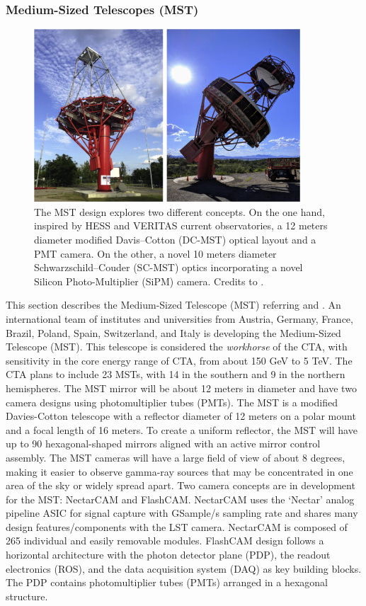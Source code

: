 \subsubsection{Medium-Sized Telescopes (MST)}
\begin{figure}[t]
\centering
\includegraphics[width=0.9\linewidth]{figures/introduction/mst.jpg}
\caption{The MST design explores two different concepts. On the one hand, inspired by HESS and VERITAS current observatories, a 12 meters diameter modified Davis–Cotton (DC-MST) optical layout and a PMT camera. On the other, a novel 10 meters diameter Schwarzschild–Couder (SC-MST) optics incorporating a novel Silicon Photo-Multiplier (SiPM) camera. Credits to \cite{Barrio_2020}.} 
\label{fig:mst}
\end{figure}
This section describes the Medium-Sized Telescope (MST) referring \cite{Barrio_2020} and \cite{ctaobservatorywebsitetechnology}.
An international team of institutes and universities from Austria, Germany, France, Brazil, Poland, Spain, Switzerland, and Italy is developing the Medium-Sized Telescope (MST). This telescope is considered the \textit{workhorse} of the CTA, with sensitivity in the core energy range of CTA, from about 150 GeV to 5 TeV. The CTA plans to include 23 MSTs, with 14 in the southern and 9 in the northern hemispheres. The MST mirror will be about 12 meters in diameter and have two camera designs using photomultiplier tubes (PMTs).
The MST is a modified Davies-Cotton telescope with a reflector diameter of 12 meters on a polar mount and a focal length of 16 meters. To create a uniform reflector, the MST will have up to 90 hexagonal-shaped mirrors aligned with an active mirror control assembly. The MST cameras will have a large field of view of about 8 degrees, making it easier to observe gamma-ray sources that may be concentrated in one area of the sky or widely spread apart. Two camera concepts are in development for the MST: NectarCAM and FlashCAM. NectarCAM uses the ‘Nectar’ analog pipeline ASIC for signal capture with GSample/s sampling rate and shares many design features/components with the LST camera. NectarCAM is composed of 265 individual and easily removable modules. FlashCAM design follows a horizontal architecture with the photon detector plane (PDP), the readout electronics (ROS), and the data acquisition system (DAQ) as key building blocks. The PDP contains photomultiplier tubes (PMTs) arranged in a hexagonal structure.
